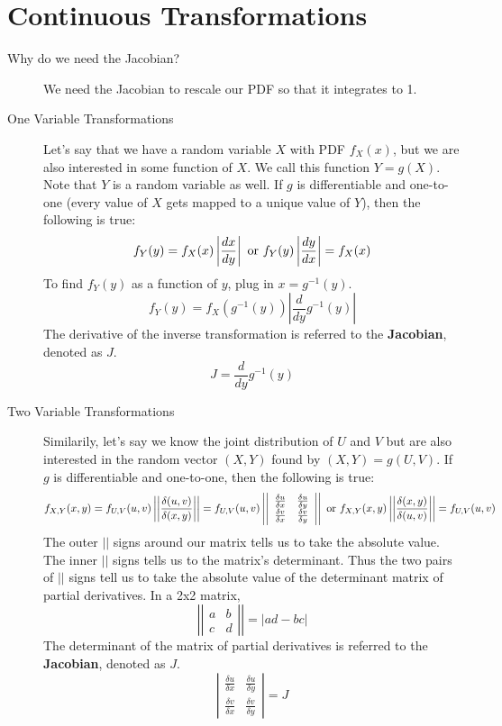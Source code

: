 \documentclass[11pt]{article}
\begin{document}
\section*{Continuous Transformations}
\begin{description}
  \item[Why do we need the Jacobian?] We need the Jacobian to rescale our PDF so that it integrates to 1.
  \item[One Variable Transformations] Let's say that we have a random variable $X$ with PDF $f_X(x)$, but we are also interested in some function of $X$. We call this function $Y = g(X)$. Note that $Y$ is a random variable as well. If $g$ is differentiable and one-to-one (every value of $X$ gets mapped to a unique value of $Y$), then the following is true:
  \[f_Y(y) = f_X(x)\left|\frac{dx}{dy}\right| \textnormal{ or } f_Y(y) \left|\frac{dy}{dx}\right|= f_X(x)\]
  To find $f_Y(y)$ as a function of $y$, plug in $x = g^{-1}(y)$.
  \[f_Y(y) = f_X(g^{-1}(y))\left|\frac{d}{dy}g^{-1}(y)\right|\]
  The derivative of the inverse transformation is referred to the \textbf{Jacobian}, denoted as $J$.
  \[J = \frac{d}{dy}g^{-1}(y)\]
  \item[Two Variable Transformations] Similarily, let's say we know the joint distribution of $U$ and $V$ but are also interested in the random vector $(X, Y)$ found by $(X, Y) = g(U, V)$. If $g$ is differentiable and one-to-one, then the following is true:
  \[f_{X,Y}(x, y) = f_{U,V}(u,v) \left|\left| \frac{\delta(u, v)}{\delta(x, y)} \right|\right| = f_{U,V}(u,v)\left| \left|
  \begin{array}{ccc}
    \frac{\delta u}{\delta x} & \frac{\delta u}{\delta y} \\
    \frac{\delta v}{\delta x} & \frac{\delta v}{\delta y}
  \end{array}
  \right| \right| \textnormal{ or } f_{X,Y}(x, y) \left|\left| \frac{\delta(x, y)}{\delta(u, v)} \right|\right| = f_{U,V}(u,v)
  \]
  The outer $||$ signs around our matrix tells us to take the absolute value. The inner $||$ signs tells us to the matrix's determinant. Thus the two pairs of $||$ signs tell us to take the absolute value of the determinant matrix of partial derivatives. In a 2x2 matrix,
  \[ \left| \left|
  \begin{array}{ccc}
    a & b \\
    c & d
  \end{array}
  \right| \right| = |ad - bc|\]
  The determinant of the matrix of partial derivatives is referred to the \textbf{Jacobian}, denoted as $J$.
  \[\left| \begin{array}{ccc}
    \frac{\delta u}{\delta x} & \frac{\delta u}{\delta y} \\
    \frac{\delta v}{\delta x} & \frac{\delta v}{\delta y}
  \end{array}\right| = J\]

\end{description}
\end{document}
